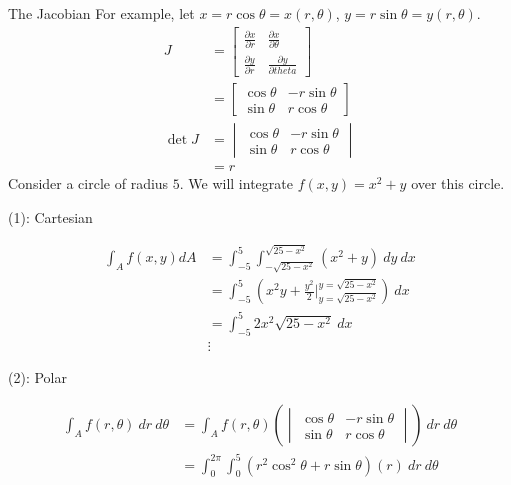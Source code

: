 \documentclass[8pt]{extarticle}
\begin{document}
\begin{problem}{The Jacobian}
    For example, let $x = r\cos \theta = x(r,\theta)$, $y = r\sin\theta = y(r,\theta)$.
    \begin{align*}
      J &= \begin{bmatrix}\frac{\partial x}{\partial r} & \frac{\partial x}{\partial \theta}\\ \frac{\partial y}{\partial r}&\frac{\partial y}{\partial theta}\end{bmatrix}\\
        &=\begin{bmatrix}\cos\theta & -r\sin\theta\\ \sin\theta&r\cos\theta\end{bmatrix}\\
      \det J &= \begin{vmatrix}\cos\theta & -r\sin\theta\\ \sin\theta&r\cos\theta\end{vmatrix}\\
             &= r
    \end{align*}
    Consider a circle of radius $5$. We will integrate $f(x,y) = x^2 + y$ over this circle.
    \begin{description}
      \item[(1): Cartesian]
    \end{description}
    \begin{align*}
      \int_{A} f(x,y) dA &= \int_{-5}^{5} \int_{-\sqrt{25-x^2}}^{\sqrt{25-x^2}}\left(x^2 + y\right)~dy~dx\\
                         &= \int_{-5}^{5} \left(x^2y + \frac{y^2}{2}\biggr\vert_{y=\sqrt{25-x^2}}^{y=\sqrt{25-x^2}}\right)~dx\\
                         &=\int_{-5}^{5} 2x^2\sqrt{25-x^2}~dx\\
                         &\vdots
    \end{align*}
    \begin{description}
      \item[(2): Polar]
    \end{description}
    \begin{align*}
      \int_{A}f(r,\theta)~dr~d\theta &= \int_{A}f(r,\theta)\left(\begin{vmatrix}\cos\theta & -r\sin\theta\\ \sin\theta&r\cos\theta\end{vmatrix}\right)~dr~d\theta\\
                                     &= \int_{0}^{2\pi}\int_{0}^{5}\left(r^2\cos^2\theta + r\sin\theta\right)(r)~dr~d\theta\\

\end{align*}
\end{problem}
\end{document}
